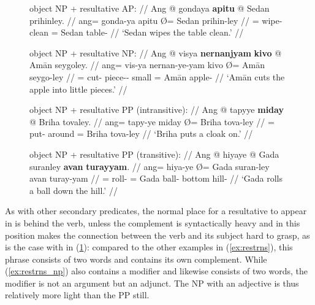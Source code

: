 \begin{figure}
\pex\label{ex:restrns}
\a\label{ex:restrns_ap}%
	\begingl
		\glpreamble object NP + resultative AP: //
		\gla Ang @ gondaya \textbf{apitu} {} @ Sedan prihinley. //
		\glb ang= gonda-ya apitu Ø= Sedan prihin-ley //
		\glc \AgtT{}= wipe-\TsgM{} clean \Top{}= Sedan table-\PargI{} //
		\glft `Sedan wipes the table clean.' //
	\endgl

\a\label{ex:restrns_np}%
	\begingl
		\glpreamble object NP + resultative NP: //
		\gla Ang @ visya \textbf{nernanjyam} \textbf{kivo} {} @ Amān
			seygoley. //
		\glb ang= vis-ya nernan-ye-yam kivo Ø= Amān seygo-ley //
		\glc \AgtT{}= cut-\TsgM{} piece-\Pl{}-\Dat{} small \Top{}= Amān 
			apple-\PargI{} //
		\glft `Amān cuts the apple into little pieces.' //
	\endgl

\a\label{ex:restrns_pp1}%
	\begingl
		\glpreamble object NP + resultative PP (intransitive): //
		\gla Ang @ tapyye \textbf{miday} {} @ Briha tovaley. //
		\glb ang= tapy-ye miday Ø= Briha tova-ley //
		\glc \AgtT{}= put-\TsgF{} around \Top{}= Briha tova-ley //
		\glft `Briha puts a cloak on.' //
	\endgl

\a\label{ex:restrns_pp2}%
	\begingl
		\glpreamble object NP + resultative PP (transitive): //
		\gla Ang @ hiyaye {} @ Gada suranley \textbf{avan} 
			\textbf{turayyam}. //
		\glb ang= hiya-ye Ø= Gada suran-ley avan turay-yam //
		\glc \AgtT{}= roll-\TsgF{} \Top{}= Gada ball-\PargI{} bottom
			hill-\Dat{} //
		\glft `Gada rolls a ball down the hill.' //
	\endgl

\xe
\end{figure}

As with other secondary predicates, the normal place for a resultative to appear
in is behind the verb, unless the complement is syntactically heavy and in this
position makes the connection between the verb and its subject hard to grasp,
as is the case with  in
(\ref{ex:restrns_pp2}): compared to the other examples in (\ref{ex:restrns}),
this phrase consists of two words and contains its own complement. While
(\ref{ex:restrns_np}) also contains a modifier and likewise consists of two
words, the modifier is not an argument but an adjunct. The NP with an adjective
is thus relatively more light than the PP still.


